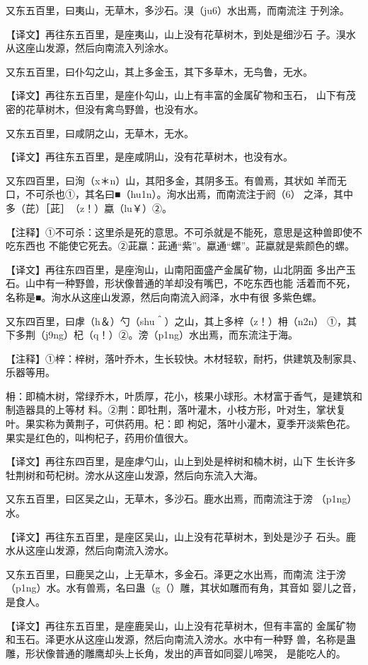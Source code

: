 \documentclass[a4paper,12pt,UTF8,twoside]{ctexbook}
\begin{document}
又东五百里，曰夷山，无草木，多沙石。湨（ju6）水出焉，而南流注 于列涂。

【译文】再往东五百里，是座夷山，山上没有花草树木，到处是细沙石 子。湨水从这座山发源，然后向南流入列涂水。

又东五百里，曰仆勾之山，其上多金玉，其下多草木，无鸟鲁，无水。

【译文】再往东五百里，是座仆勾山，山上有丰富的金属矿物和玉石， 山下有茂密的花草树木，但没有禽鸟野兽，也没有水。

又东五百里，曰咸阴之山，无草木，无水。

【译文】再往东五百里，是座咸阴山，没有花草树木，也没有水。

又东四百里，曰洵（x＊n）山，其阳多金，其阴多玉。有兽焉，其状如 羊而无口，不可杀也①，其名曰■（hu1n）。洵水出焉，而南流注于阏（6） 之泽，其中多（芘）［茈］　（z！）蠃（lu￥）②。

【注释】①不可杀：这里杀是死的意思。不可杀就是不能死，意思是这种兽即使不吃东西也 不能使它死去。②茈蠃：茈通“紫”。蠃通“螺”。茈蠃就是紫颜色的螺。

【译文】再往东四百里，是座洵山，山南阳面盛产金属矿物，山北阴面 多出产玉石。山中有一种野兽，形状像普通的羊却没有嘴巴，不吃东西也能 活着而不死，名称是■。洵水从这座山发源，然后向南流入阏泽，水中有很 多紫色螺。

又东四百里，曰虖（h＆）勺（shu＾）之山，其上多梓（z！）枏（n2n） ①，其下多荆（j9ng）杞（q！）②。滂（p1ng）水出焉，而东流注于海。

【注释】①梓：梓树，落叶乔木，生长较快。木材轻软，耐朽，供建筑及制家具、乐器等用。

枏：即楠木树，常绿乔木，叶质厚，花小，核果小球形。木材富于香气，是建筑和制造器具的上等材 料。②荆：即牡荆，落叶灌木，小枝方形，叶对生，掌状复叶。果实称为黄荆子，可供药用。杞：即 枸妃，落叶小灌木，夏季开淡紫色花。果实是红色的，叫枸杞子，药用价值很大。

【译文】再往东四百里，是座虖勺山，山上到处是梓树和楠木树，山下 生长许多牡荆树和苟杞树。滂水从这座山发源，然后向东流入大海。

又东五百里，曰区吴之山，无草木，多沙石。鹿水出焉，而南流注于滂 （p1ng）水。

【译文】再往东五百里，是座区吴山，山上没有花草树木，到处是沙子 石头。鹿水从这座山发源，然后向南流入滂水。

又东五百里，曰鹿吴之山，上无草木，多金石。泽更之水出焉，而南流 注于滂（p1ng）水。水有兽焉，名曰蛊（g（）雕，其状如雕而有角，其音如 婴儿之音，是食人。

【译文】再往东五百里，是座鹿吴山，山上没有花草树木，但有丰富的 金属矿物和玉石。泽更水从这座山发源，然后向南流入滂水。水中有一种野 兽，名称是蛊雕，形状像普通的雕鹰却头上长角，发出的声音如同婴儿啼哭， 是能吃人的。
\end{document}
